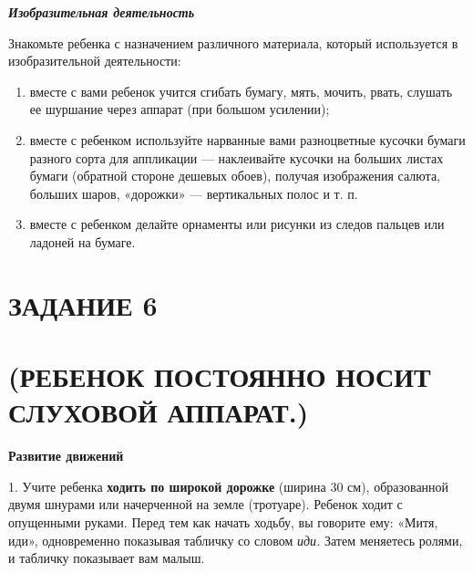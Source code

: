 \documentclass[a5paper]{book}
\renewcommand{\emph}[1]{\textit{#1}}
\begin{document}
\emph{\textbf{Изобразительная деятельность}}

Знакомьте ребенка с назначением различного материала, который
используется в изобразительной деятельности:


\begin{enumerate}
\def\labelenumi{\arabic{enumi})}
\item
  
  вместе с вами ребенок учится сгибать бумагу, мять, мочить, рвать,
  слушать ее шуршание через аппарат (при большом усилении);
  
\item
  
  вместе с ребенком используйте нарванные вами разноцветные кусочки
  бумаги разного сорта для аппликации --- наклеивайте кусочки на больших
  листах бумаги (обратной стороне дешевых обоев), получая изображения
  салюта, больших шаров, «дорожки» --- вертикальных полос и т. п.
  
\item
  
  вместе с ребенком делайте орнаменты или рисунки из следов пальцев или
  ладоней на бумаге.
  
\end{enumerate}


\section{ЗАДАНИЕ 6}\section*{(РЕБЕНОК ПОСТОЯННО НОСИТ СЛУХОВОЙ АППАРАТ.)}

\textbf{Развитие движений}

1. Учите ребенка \textbf{ходить по широкой дорожке} (ширина 30 см),
образованной двумя шнурами или начерченной на земле (тротуаре). Ребенок
ходит с опущенными руками. Перед тем как начать ходьбу, вы говорите ему:
«Митя, иди», одновременно показывая табличку со словом \emph{иди.} Затем
меняетесь ролями, и табличку показывает вам малыш.
\end{document}
